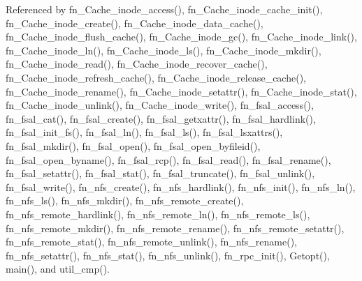 Referenced by fn\_\-Cache\_\-inode\_\-access(), fn\_\-Cache\_\-inode\_\-cache\_\-init(), fn\_\-Cache\_\-inode\_\-create(), fn\_\-Cache\_\-inode\_\-data\_\-cache(), fn\_\-Cache\_\-inode\_\-flush\_\-cache(), fn\_\-Cache\_\-inode\_\-gc(), fn\_\-Cache\_\-inode\_\-link(), fn\_\-Cache\_\-inode\_\-ln(), fn\_\-Cache\_\-inode\_\-ls(), fn\_\-Cache\_\-inode\_\-mkdir(), fn\_\-Cache\_\-inode\_\-read(), fn\_\-Cache\_\-inode\_\-recover\_\-cache(), fn\_\-Cache\_\-inode\_\-refresh\_\-cache(), fn\_\-Cache\_\-inode\_\-release\_\-cache(), fn\_\-Cache\_\-inode\_\-rename(), fn\_\-Cache\_\-inode\_\-setattr(), fn\_\-Cache\_\-inode\_\-stat(), fn\_\-Cache\_\-inode\_\-unlink(), fn\_\-Cache\_\-inode\_\-write(), fn\_\-fsal\_\-access(), fn\_\-fsal\_\-cat(), fn\_\-fsal\_\-create(), fn\_\-fsal\_\-getxattr(), fn\_\-fsal\_\-hardlink(), fn\_\-fsal\_\-init\_\-fs(), fn\_\-fsal\_\-ln(), fn\_\-fsal\_\-ls(), fn\_\-fsal\_\-lsxattrs(), fn\_\-fsal\_\-mkdir(), fn\_\-fsal\_\-open(), fn\_\-fsal\_\-open\_\-byfileid(), fn\_\-fsal\_\-open\_\-byname(), fn\_\-fsal\_\-rcp(), fn\_\-fsal\_\-read(), fn\_\-fsal\_\-rename(), fn\_\-fsal\_\-setattr(), fn\_\-fsal\_\-stat(), fn\_\-fsal\_\-truncate(), fn\_\-fsal\_\-unlink(), fn\_\-fsal\_\-write(), fn\_\-nfs\_\-create(), fn\_\-nfs\_\-hardlink(), fn\_\-nfs\_\-init(), fn\_\-nfs\_\-ln(), fn\_\-nfs\_\-ls(), fn\_\-nfs\_\-mkdir(), fn\_\-nfs\_\-remote\_\-create(), fn\_\-nfs\_\-remote\_\-hardlink(), fn\_\-nfs\_\-remote\_\-ln(), fn\_\-nfs\_\-remote\_\-ls(), fn\_\-nfs\_\-remote\_\-mkdir(), fn\_\-nfs\_\-remote\_\-rename(), fn\_\-nfs\_\-remote\_\-setattr(), fn\_\-nfs\_\-remote\_\-stat(), fn\_\-nfs\_\-remote\_\-unlink(), fn\_\-nfs\_\-rename(), fn\_\-nfs\_\-setattr(), fn\_\-nfs\_\-stat(), fn\_\-nfs\_\-unlink(), fn\_\-rpc\_\-init(), Getopt(), main(), and util\_\-cmp().